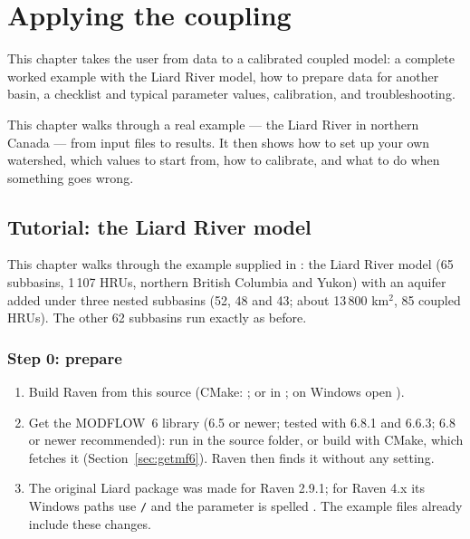 \chapter{Applying the coupling}\label{ch:c7}
This chapter takes the user from data to a calibrated coupled model: a complete worked example with the Liard River model,
how to prepare data for another basin, a checklist and typical parameter values, calibration, and troubleshooting.

\begin{plain}
This chapter walks through a real example --- the Liard River in northern Canada --- from input files to results. It then
shows how to set up your own watershed, which values to start from, how to calibrate, and what to do when something goes
wrong.
\end{plain}

\section{Tutorial: the Liard River model}\label{ch:tutorial}
This chapter walks through the example supplied in : the Liard River model (65 subbasins,
1\,107 HRUs, northern British Columbia and Yukon) with an aquifer added under three nested subbasins (52, 48 and 43;
about 13\,800 km$^2$, 85 coupled HRUs). The other 62 subbasins run exactly as before.

\subsection{Step 0: prepare}
\begin{enumerate}
\item Build Raven from this source (CMake: ; or  in ; on Windows open ).
\item Get the MODFLOW~6 library (6.5 or newer; tested with 6.8.1 and 6.6.3; 6.8 or newer recommended): run
 in the source folder, or build with CMake, which fetches it (Section~\ref{sec:getmf6}).
Raven then finds it without any setting.
\item The original Liard package was made for Raven 2.9.1; for Raven 4.x its Windows paths use \texttt{/} and the parameter
 is spelled . The example files already include these changes.
\end{enumerate}


